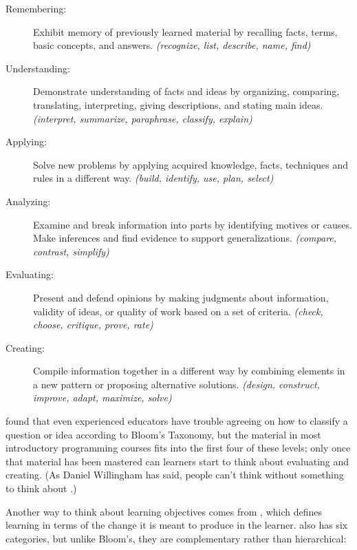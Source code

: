 \begin{description}

\item[Remembering:] Exhibit memory of previously learned material by
  recalling facts, terms, basic concepts, and answers.
  \emph{(recognize, list, describe, name, find)}

\item[Understanding:] Demonstrate understanding of facts and ideas by
  organizing, comparing, translating, interpreting, giving
  descriptions, and stating main ideas.
  \emph{(interpret, summarize, paraphrase, classify, explain)}

\item[Applying:] Solve new problems by applying acquired knowledge,
  facts, techniques and rules in a different way.  \emph{(build,
    identify, use, plan, select)}

\item[Analyzing:] Examine and break information into parts by
  identifying motives or causes.  Make inferences and find evidence to
  support generalizations.
  \emph{(compare, contrast, simplify)}

\item[Evaluating:] Present and defend opinions by making judgments
  about information, validity of ideas, or quality of work based on a
  set of criteria.
  \emph{(check, choose, critique, prove, rate)}

\item[Creating:] Compile information together in a different way by
  combining elements in a new pattern or proposing alternative
  solutions.
  \emph{(design, construct, improve, adapt, maximize, solve)}

\end{description}

\cite{Masa2018} found that even experienced educators have trouble
agreeing on how to classify a question or idea according to Bloom's
Taxonomy, but the material in most introductory programming courses
fits into the first four of these levels; only once that material has
been mastered can learners start to think about evaluating and
creating.  (As Daniel Willingham has said, people can't think without
something to think about \cite{Will2010}.)

Another way to think about learning objectives comes from
\cite{Fink2013}, which defines learning in terms of the change it is
meant to produce in the learner.   also has six categories, but unlike Bloom's, they are
complementary rather than hierarchical:

